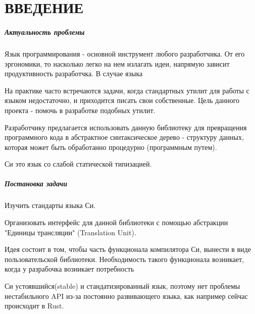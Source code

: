 \chapter*{ВВЕДЕНИЕ}                         %

\paragraph*{Актуальность проблемы}
Язык программирования - основной инструмент любого разработчика. От его эргономики, то насколько легко на нем излагать идеи, напрямую зависит продуктивность разработчка.
В случае языка

На практике часто встречаются задачи, когда стандартных утилит для работы с языком недостаточно, и приходится писать свои собственные.
Цель данного проекта - помочь в разработке подобных утилит.

Разработчику предлагается использовать данную библиотеку для превращения программного кода в абстрактное синтаксическое дерево - 
структуру данных, которая может быть обработанно процедурно (программным путем).

Си это язык со слабой статической типизацией.

\def\titlecite#1{\citetitle{#1}\cite{#1}}

\paragraph*{Постановка задачи}
Изучить стандарты\cite{c99_std}\cite{c23_std} языка Си.

Организовать интерфейс для данной библиотеки с помощью абстракции "Единицы трансляции" (Translation Unit)\cite{wiki-tr-unit}.


Идея состоит в том, чтобы часть функционала компилятора Си, вынести в виде пользовательской библиотеки.
Необходимость такого функционала возникает, когда у разрабочка возникает потребность 

Си устоявшийся(stable) и стандатизированный язык, 
поэтому нет проблемы нестабильного API из-за постоянно развивающего языка, как например сейчас происходит в Rust.

